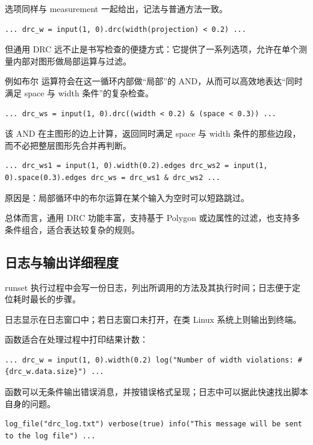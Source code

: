 选项同样与 measurement 一起给出，记法与普通方法一致。

\begin{lstlisting}
... drc_w = input(1, 0).drc(width(projection) < 0.2) ...
\end{lstlisting}

但通用 DRC 远不止是书写检查的便捷方式：它提供了一系列选项，允许在单个测量内部对图形做局部运算与过滤。

例如布尔  运算符会在这一循环内部做“局部”的 AND，从而可以高效地表达“同时满足 space 与 width 条件”的复杂检查。

\begin{lstlisting}
... drc_ws = input(1, 0).drc((width < 0.2) & (space < 0.3)) ...
\end{lstlisting}

该 AND 在主图形的边上计算，返回同时满足 space 与 width 条件的那些边段，而不必把整层图形先合并再判断。

\begin{lstlisting}
... drc_ws1 = input(1, 0).width(0.2).edges drc_ws2 = input(1, 0).space(0.3).edges drc_ws = drc_ws1 & drc_ws2 ...
\end{lstlisting}

原因是：局部循环中的布尔运算在某个输入为空时可以短路跳过。

总体而言，通用 DRC 功能丰富，支持基于 Polygon 或边属性的过滤，也支持多条件组合，适合表达较复杂的规则。

\subsection{日志与输出详细程度}

runset 执行过程中会写一份日志，列出所调用的方法及其执行时间；日志便于定位耗时最长的步骤。

日志显示在日志窗口中；若日志窗口未打开，在类 Linux 系统上则输出到终端。

 函数适合在处理过程中打印结果计数：

\begin{lstlisting}
... drc_w = input(1, 0).width(0.2) log("Number of width violations: #{drc_w.data.size}") ...
\end{lstlisting}

 函数可以无条件输出错误消息，并按错误格式呈现；日志中可以据此快速找出脚本自身的问题。

\begin{lstlisting}
log_file("drc_log.txt") verbose(true) info("This message will be sent to the log file") ...
\end{lstlisting}

